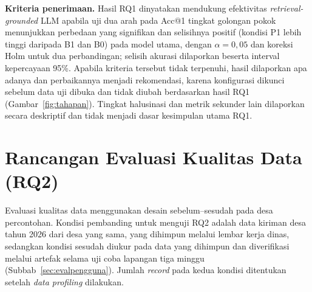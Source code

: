 \textbf{Kriteria penerimaan.} Hasil RQ1 dinyatakan mendukung efektivitas \textit{retrieval-grounded} LLM apabila uji dua arah pada Acc@1 tingkat golongan pokok menunjukkan perbedaan yang signifikan dan selisihnya positif (kondisi P1 lebih tinggi daripada B1 dan B0) pada model utama, dengan $\alpha = 0{,}05$ dan koreksi Holm untuk dua perbandingan; selisih akurasi dilaporkan beserta interval kepercayaan 95\%. Apabila kriteria tersebut tidak terpenuhi, hasil dilaporkan apa adanya dan perbaikannya menjadi rekomendasi, karena konfigurasi dikunci sebelum data uji dibuka dan tidak diubah berdasarkan hasil RQ1 (Gambar~\ref{fig:tahapan}). Tingkat halusinasi dan metrik sekunder lain dilaporkan secara deskriptif dan tidak menjadi dasar kesimpulan utama RQ1.

\section{Rancangan Evaluasi Kualitas Data (RQ2)}
\label{sec:evalkualitas}

Evaluasi kualitas data menggunakan desain sebelum--sesudah pada desa percontohan. Kondisi pembanding untuk menguji RQ2 adalah data kiriman desa tahun 2026 dari desa yang sama, yang dihimpun melalui lembar kerja dinas, sedangkan kondisi sesudah diukur pada data yang dihimpun dan diverifikasi melalui artefak selama uji coba lapangan tiga minggu (Subbab~\ref{sec:evalpengguna}). Jumlah \textit{record} pada kedua kondisi ditentukan setelah \textit{data profiling} dilakukan.


